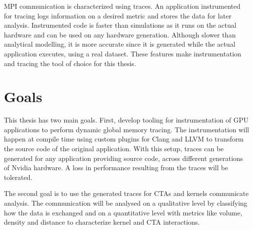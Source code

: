 MPI communication is characterized using traces. An application instrumented for tracing logs information on a desired metric and stores the data for later analysis. Instrumented code is faster than simulations as it runs on the actual hardware and can be used on any hardware generation. Although slower than analytical modelling, it is more accurate since it is generated while the actual application executes, using a real dataset.
These features make instrumentation and tracing the tool of choice for this thesis.


%	
\section{Goals}
This thesis has two main goals. First, develop tooling for instrumentation of GPU applications to perform dynamic global memory tracing. The instrumentation will happen at compile time using custom plugins for Clang and LLVM to transform the source code of the
original application. With this setup, traces can be generated for any application providing source code,
across different generations of Nvidia hardware. A loss in performance resulting from the traces will be tolerated.

The second goal is to use the generated traces for CTAs and kernels communicate analysis. The communication will be analysed on a qualitative level by classifying how the data is exchanged and on a quantitative level with metrics like volume, density and distance to characterize kernel and CTA interactions.


